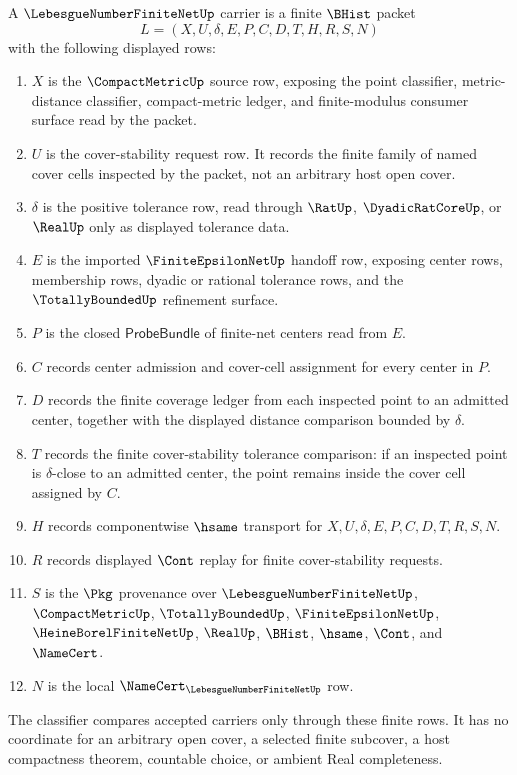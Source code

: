 \begin{definition}
\label{def:lebesgue-number-finite-net-carrier}
A $\LebesgueNumberFiniteNetUp$ carrier is a finite $\BHist$ packet
$$
L=(X,U,\delta,E,P,C,D,T,H,R,S,N)
$$
with the following displayed rows:
\begin{enumerate}
\item $X$ is the $\CompactMetricUp$ source row, exposing the point classifier, metric-distance classifier, compact-metric ledger, and finite-modulus consumer surface read by the packet.
\item $U$ is the cover-stability request row. It records the finite family of named cover cells inspected by the packet, not an arbitrary host open cover.
\item $\delta$ is the positive tolerance row, read through $\RatUp$, $\DyadicRatCoreUp$, or $\RealUp$ only as displayed tolerance data.
\item $E$ is the imported $\FiniteEpsilonNetUp$ handoff row, exposing center rows, membership rows, dyadic or rational tolerance rows, and the $\TotallyBoundedUp$ refinement surface.
\item $P$ is the closed $\mathsf{ProbeBundle}$ of finite-net centers read from $E$.
\item $C$ records center admission and cover-cell assignment for every center in $P$.
\item $D$ records the finite coverage ledger from each inspected point to an admitted center, together with the displayed distance comparison bounded by $\delta$.
\item $T$ records the finite cover-stability tolerance comparison: if an inspected point is $\delta$-close to an admitted center, the point remains inside the cover cell assigned by $C$.
\item $H$ records componentwise $\hsame$ transport for $X,U,\delta,E,P,C,D,T,R,S,N$.
\item $R$ records displayed $\Cont$ replay for finite cover-stability requests.
\item $S$ is the $\Pkg$ provenance over $\LebesgueNumberFiniteNetUp$, $\CompactMetricUp$, $\TotallyBoundedUp$, $\FiniteEpsilonNetUp$, $\HeineBorelFiniteNetUp$, $\RealUp$, $\BHist$, $\hsame$, $\Cont$, and $\NameCert$.
\item $N$ is the local $\NameCert_{\LebesgueNumberFiniteNetUp}$ row.
\end{enumerate}
The classifier compares accepted carriers only through these finite rows. It has no coordinate for an arbitrary open cover, a selected finite subcover, a host compactness theorem, countable choice, or ambient Real completeness.
\end{definition}

